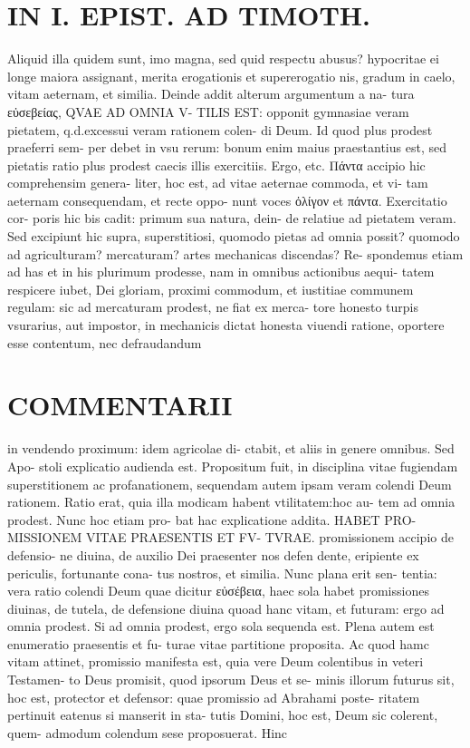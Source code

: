 \documentclass{article}
\begin{document}
\begin{pages}
\section*{IN I. EPIST. AD TIMOTH. }
\marginpar{[ p.99 ]}\pstart Aliquid illa quidem sunt, imo magna, sed quid respectu abusus? hypocritae ei longe maiora assignant, merita erogationis et supererogatio nis, gradum in caelo, vitam aeternam, et similia.  \pend\pstart Deinde addit alterum argumentum a na- tura εὐσεβείας, QVAE AD OMNIA V- TILIS EST: opponit gymnasiae veram pietatem, q.d.excessui veram rationem colen- di Deum. Id quod plus prodest praeferri sem- per debet in vsu rerum: bonum enim maius praestantius est, sed pietatis ratio plus prodest caecis illis exercitiis. Ergo, etc.  \pend\pstart Πάντα accipio hic comprehensim genera- liter, hoc est, ad vitae aeternae commoda, et vi- tam aeternam consequendam, et recte oppo- nunt voces ὀλίγον et πάντα. Exercitatio cor- poris hic bis cadit: primum sua natura, dein- de relatiue ad pietatem veram. Sed excipiunt hic supra, superstitiosi, quomodo pietas ad omnia possit? quomodo ad agriculturam? mercaturam? artes mechanicas discendas? Re- spondemus etiam ad has et in his plurimum prodesse, nam in omnibus actionibus aequi- tatem respicere iubet, Dei gloriam, proximi commodum, et iustitiae communem regulam: sic ad mercaturam prodest, ne fiat ex merca- tore honesto turpis vsurarius, aut impostor, in mechanicis dictat honesta viuendi ratione, oportere esse contentum, nec defraudandum  \pend
\marginpar{[ p.100 ]}
\section*{COMMENTARII }\pstart in vendendo proximum: idem agricolae di- ctabit, et aliis in genere omnibus. Sed Apo- stoli explicatio audienda est. Propositum fuit, in disciplina vitae fugiendam superstitionem ac profanationem, sequendam autem ipsam veram colendi Deum rationem. Ratio erat, quia illa modicam habent vtilitatem:hoc au- tem ad omnia prodest. Nunc hoc etiam pro- bat hac explicatione addita. HABET PRO- MISSIONEM VITAE PRAESENTIS ET FV- TVRAE. promissionem accipio de defensio- ne diuina, de auxilio Dei praesenter nos defen dente, eripiente ex periculis, fortunante cona- tus nostros, et similia. Nunc plana erit sen- tentia: vera ratio colendi Deum quae dicitur εὐσέβεια, haec sola habet promissiones diuinas, de tutela, de defensione diuina quoad hanc vitam, et futuram: ergo ad omnia prodest. Si ad omnia prodest, ergo sola sequenda est. Plena autem est enumeratio praesentis et fu- turae vitae partitione proposita. Ac quod hamc vitam attinet, promissio manifesta est, quia vere Deum colentibus in veteri Testamen- to Deus promisit, quod ipsorum Deus et se- minis illorum futurus sit, hoc est, protector et defensor: quae promissio ad Abrahami poste- ritatem pertinuit eatenus si manserit in sta- tutis Domini, hoc est, Deum sic colerent, quem- admodum colendum sese proposuerat. Hinc  \pend

\end{pages}
\end{document}

